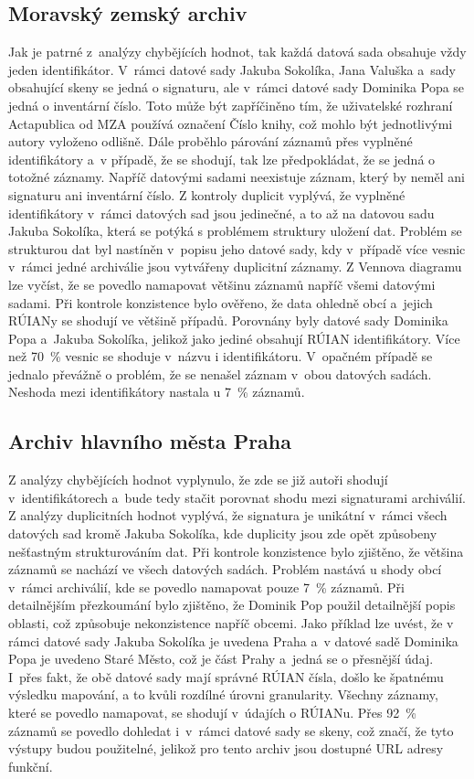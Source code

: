\subsection{Moravský zemský archiv}
Jak je patrné z~analýzy chybějících hodnot, tak každá datová sada obsahuje vždy jeden identifikátor. V~rámci datové sady Jakuba Sokolíka, Jana Valuška a~sady obsahující skeny se jedná o signaturu, ale v~rámci datové sady Dominika Popa se jedná o inventární číslo. Toto může být zapříčiněno tím, že uživatelské rozhraní Actapublica od MZA používá označení Číslo knihy, což mohlo být jednotlivými autory vyloženo odlišně. Dále proběhlo párování záznamů přes vyplněné identifikátory a~v případě, že se shodují, tak lze předpokládat, že se jedná o totožné záznamy. Napříč datovými sadami neexistuje záznam, který by neměl ani signaturu ani inventární číslo.
Z kontroly duplicit vyplývá, že vyplněné identifikátory v~rámci datových sad jsou jedinečné, a to až na datovou sadu Jakuba Sokolíka, která se potýká s problémem struktury uložení dat. Problém se strukturou dat byl nastíněn v~popisu jeho datové sady, kdy v~případě více vesnic v~rámci jedné archiválie jsou vytvářeny duplicitní záznamy.
Z Vennova diagramu lze vyčíst, že se povedlo namapovat většinu záznamů napříč všemi datovými sadami.
Při kontrole konzistence bylo ověřeno, že data ohledně obcí a~jejich RÚIANy se shodují ve většině případů. Porovnány byly datové sady Dominika Popa a~Jakuba Sokolíka, jelikož jako jediné obsahují RÚIAN identifikátory. Více než 70~\% vesnic se shoduje v~názvu i identifikátoru. V~opačném případě se jednalo převážně o problém, že se nenašel záznam v~obou datových sadách. Neshoda mezi identifikátory nastala u 7~\% záznamů.

\subsection{Archiv hlavního města Praha}

Z analýzy chybějících hodnot vyplynulo, že zde se již autoři shodují v~identifikátorech a~bude tedy stačit porovnat shodu mezi signaturami archiválií.
Z analýzy duplicitních hodnot vyplývá, že signatura je unikátní v~rámci všech datových sad kromě Jakuba Sokolíka, kde duplicity jsou zde opět způsobeny nešťastným strukturováním dat. Při kontrole konzistence bylo zjištěno, že většina záznamů se nachází ve všech datových sadách. Problém nastává u shody obcí v~rámci archiválií, kde se povedlo namapovat pouze 7~\% záznamů. Při detailnějším přezkoumání bylo zjištěno, že Dominik Pop použil detailnější popis oblasti, což způsobuje nekonzistence napříč obcemi. Jako příklad lze uvést, že v rámci datové sady Jakuba Sokolíka je uvedena Praha a~v datové sadě Dominika Popa je uvedeno Staré Město, což je část Prahy a~jedná se o přesnější údaj. I~přes fakt, že obě datové sady mají správné RÚIAN čísla, došlo ke špatnému výsledku mapování, a to kvůli rozdílné úrovni granularity. Všechny záznamy, které se povedlo namapovat, se shodují v~údajích o RÚIANu. Přes 92~\% záznamů se povedlo dohledat i~v~rámci datové sady se skeny, což značí, že tyto výstupy budou použitelné, jelikož pro tento archiv jsou dostupné URL adresy funkční.

